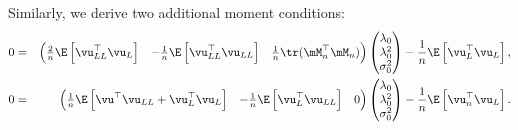 Similarly, we derive two additional moment conditions:
\begin{eqnarray}
 0 & = & \begin{pmatrix}
            \frac{2}{n}\E\left[\vu^\top_{LL}\vu_L\right] & -\frac{1}{n}\E\left[\vu_{LL}^\top\vu_{LL}\right] & \frac{1}{n} \tr(\mM^\top_n\mM_n)
          \end{pmatrix}
                      \begin{pmatrix}
              \lambda_0 \\
              \lambda^2_0 \\
              \sigma^2_0
            \end{pmatrix} - \frac{1}{n}\E\left[\vu^\top_L\vu_L\right]\label{eq:Pequation_2_gmm}, \\
 0 & = & \begin{pmatrix}
            \frac{1}{n}\E\left[\vu^\top\vu_{LL} + \vu_L^\top\vu_L\right] & - \frac{1}{n}\E\left[\vu_{L}^\top\vu_{LL}\right] & 0
          \end{pmatrix}
                      \begin{pmatrix}
              \lambda_0 \\
              \lambda^2_0 \\
              \sigma^2_0
            \end{pmatrix} - \frac{1}{n}\E\left[\vu^\top_n\vu_L\right].\label{eq:Pequation_3_gmm}
\end{eqnarray}

